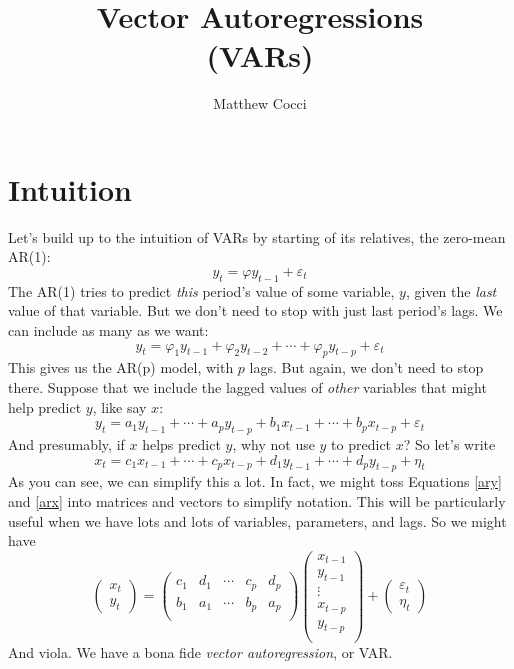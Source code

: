\documentclass[a4paper,12pt]{scrartcl}
\author{Matthew Cocci}
\title{Vector Autoregressions \\ (VARs)}
\date{}
\begin{document}
\maketitle


\section{Intuition}

Let's build up to the intuition of VARs by starting of its
relatives, the zero-mean AR(1):
    \[ y_t = \varphi y_{t-1} + \varepsilon_t \]
The AR(1) tries to predict \emph{this} period's value 
of some variable, $y$, given the \emph{last} value
of that variable. But we don't need to stop with just
last period's lags.  We can include as many as we want:
    \[ y_t = \varphi_1 y_{t-1} + \varphi_2 y_{t-2} + \cdots
	+ \varphi_p y_{t-p} + \varepsilon_t \]
This gives us the AR(p) model, with $p$ lags. But again,
we don't need to stop there. Suppose that we include
the lagged values of \emph{other} variables that might
help predict $y$, like say $x$:
\begin{equation}
    \label{ary}
     y_t = a_1 y_{t-1}  + \cdots +
	a_p y_{t-p} + b_1 x_{t-1} +  \cdots
	+ b_p x_{t-p} + \varepsilon_t 
\end{equation}
And presumably, if $x$ helps predict $y$, why not use 
$y$ to predict $x$? So let's write
\begin{equation}
    \label{arx}
    x_t = c_1 x_{t-1}  + \cdots +
	c_p x_{t-p} + d_1 y_{t-1} +  \cdots
	+ d_p y_{t-p} + \eta_t 
\end{equation}
As you can see, we can simplify this a lot. In fact,
we might toss Equations \ref{ary} and \ref{arx} into
matrices and vectors to simplify notation.  This
will be particularly useful when we have lots and
lots of variables, parameters, and lags. So we might
have
\begin{equation}
    \begin{pmatrix} x_t \\ y_t \end{pmatrix} = 
	\begin{pmatrix} c_1 & d_1 & \cdots & c_p & d_p \\
	    b_1 & a_1 & \cdots & b_p & a_p \\
	\end{pmatrix}
	\begin{pmatrix} x_{t-1} \\ y_{t-1} \\
	    \vdots \\ 
	    x_{t-p} \\ y_{t-p} \\
	\end{pmatrix}  
	+ \begin{pmatrix} \varepsilon_t \\ \eta_t
	 \end{pmatrix}
\end{equation}
And viola. We have a bona fide \emph{vector autoregression}, 
or VAR. 
\end{document}
